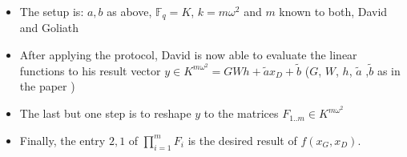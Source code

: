 \documentclass[12pt, a4paper]{article}
\begin{document}
\begin{itemize}

\item The setup is: $a, b$ as above, $\mathbb{F}_q = K$, $k = m\omega^2$ and $m$
known to both, David and Goliath

\item After applying the protocol, David is now able to evaluate the linear
functions to his result vector $y \in K^{m\omega^2} = GWh + \tilde{a}x_D +
\tilde{b}$ ($G$, $W$, $h$, $\tilde{a}$ ,$\tilde{b}$ as in the paper
\cite{davidgoliath})

\item The last but one step is to reshape $y$ to the matrices $F_{1..m}
\in K^{m\omega^2}$

\item Finally, the entry $2, 1$ of $\prod_{i=1}^m F_i$ is the desired result of
$f(x_G,x_D)$.

\end{itemize}


\end{document}

